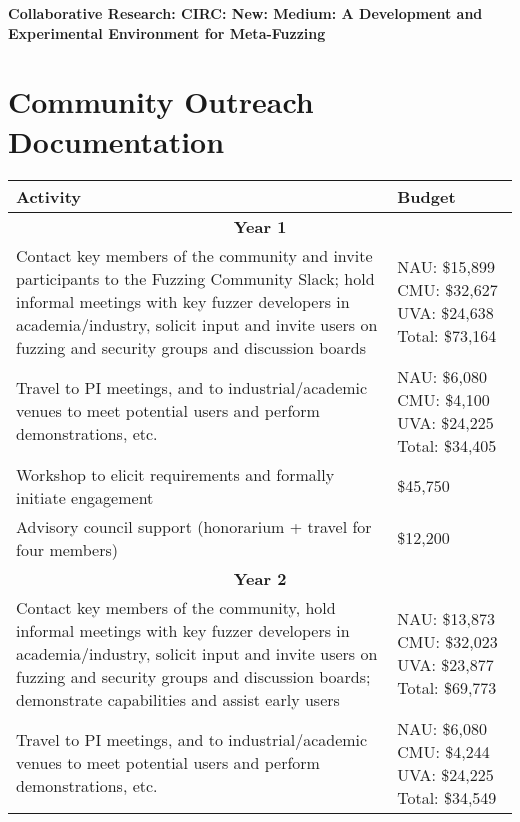 \documentclass[12pt]{article}
\begin{document}
\begin{center} {\Large\sf\textbf{Collaborative Research: CIRC: New: Medium: A
      Development and Experimental Environment for Meta-Fuzzing}}
\end{center}

\section*{Community Outreach Documentation}


\begin{table}
  \begin{tabular}{|p{12cm}|p{3cm}|}
    \hline
    {\bf Activity} & {\bf Budget} \\
    \hline 
    \multicolumn{2}{c}{{\bf Year 1}} \\
    \hline
    Contact key members of the community and invite participants to the
    Fuzzing Community Slack; hold informal meetings with
    key fuzzer developers in academia/industry, solicit input and
    invite users
    on fuzzing and security groups and discussion boards &  NAU: \$15,899 CMU: \$32,627 UVA: \$24,638
                                                      Total:  \$73,164 \\
    \hline
    Travel to PI meetings, and to industrial/academic venues to meet
    potential users and perform demonstrations, etc. & NAU: \$6,080
                                                       CMU: \$4,100 UVA:
                                                       \$24,225 Total: \$34,405\\
    \hline
    Workshop to elicit requirements and formally initiate engagement
& \$45,750 \\
    \hline 
    Advisory council support (honorarium + travel for four members) 
  & \$12,200 \\
    \hline
    \hline
    \multicolumn{2}{c}{{\bf Year 2}} \\
    \hline
    \hline
    Contact key members of the community, hold informal meetings with
    key fuzzer developers in academia/industry, solicit input and
    invite users
    on fuzzing and security groups and discussion boards; demonstrate
    capabilities and assist early users&  NAU:  \$13,873 CMU:  \$32,023 UVA: \$23,877
                                                      Total: \$69,773  \\
    \hline
    Travel to PI meetings, and to industrial/academic venues to meet
    potential users and perform demonstrations, etc. & NAU: \$6,080 CMU: \$4,244 UVA:  \$24,225 Total: \$34,549\\

\end{tabular}
\end{table}
\end{document}

